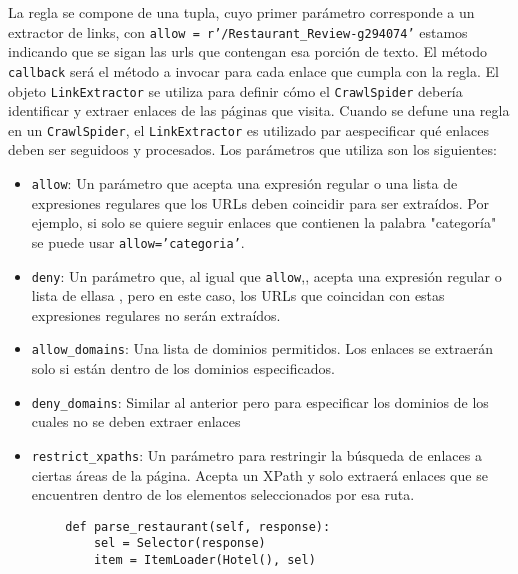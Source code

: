         La regla se compone de una tupla, cuyo primer parámetro corresponde a un extractor de links, con \texttt{allow = r'/Restaurant\_Review-g294074'} estamos indicando que se sigan las urls que contengan esa porción de texto. El método \texttt{callback} será el método a invocar para cada enlace que cumpla con la regla. El objeto \texttt{LinkExtractor} se utiliza para definir cómo el \texttt{CrawlSpider} debería identificar y extraer enlaces de las páginas que visita. Cuando se defune una regla en un \texttt{CrawlSpider}, el \texttt{LinkExtractor} es utilizado par aespecificar qué enlaces deben ser seguidoos y procesados. Los parámetros que utiliza son los siguientes: 

        \begin{itemize}
            \item \texttt{allow}: Un parámetro que acepta una expresión regular o una lista de expresiones regulares que los URLs deben coincidir para ser extraídos. Por ejemplo, si solo se quiere seguir enlaces que contienen la palabra "categoría" se puede usar \texttt{allow='categoria'}.
            \item \texttt{deny}: Un parámetro que, al igual que \texttt{allow},, acepta una expresión regular o lista de ellasa , pero en este caso, los URLs que coincidan con estas expresiones regulares no serán extraídos.
            \item \texttt{allow\_domains}: Una lista de dominios permitidos. Los enlaces se extraerán solo si están dentro de los dominios especificados.
            \item \texttt{deny\_domains}: Similar al anterior pero para especificar los dominios de los cuales no se deben extraer enlaces
            \item \texttt{restrict\_xpaths}: Un parámetro para restringir la búsqueda de enlaces a ciertas áreas de la página. Acepta un XPath y solo extraerá enlaces que se encuentren dentro de los elementos seleccionados por esa ruta.
        \end{itemize}

        \begin{verbatim}
        def parse_restaurant(self, response):
            sel = Selector(response)
            item = ItemLoader(Hotel(), sel)
        \end{verbatim}